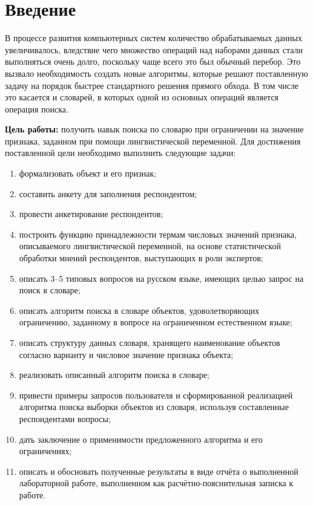 \chapter*{Введение}

В процессе развития компьютерных систем количество обрабатываемых данных увеличивалось, вледствие чего множество операций над наборами данных стали выполняться очень долго, поскольку чаще всего это был обычный перебор. 
Это вызвало необходимость создать новые алгоритмы, которые решают поставленную задачу на порядок быстрее стандартного решения прямого обхода. 
В том числе это касается и словарей, в которых одной из основных операций является операция поиска.


\textbf{Цель работы:} получить навык поиска по словарю при ограничении на значение признака, заданном при помощи лингвистической переменной.
Для достижения поставленной цели необходимо выполнить следующие задачи:
\begin{enumerate}[label=\arabic*)]
	\item формализовать объект и его признак;
	\item составить анкету для заполнения респондентом;
	\item провести анкетирование респондентов;
	\item построить функцию принадлежности термам числовых значений признака, описываемого лингвистической переменной, на основе статистической обработки мнений респондентов, выступающих в роли экспертов;
	\item описать 3--5 типовых вопросов на русском языке, имеющих целью запрос на поиск в словаре;
	\item описать алгоритм поиска в словаре объектов, удоволетворяющих ограничению, заданному в вопросе на ограниченном естественном языке;
	\item описать структуру данных словаря, хранящего наименование объектов согласно варианту и числовое значение признака объекта;
	\item реализовать описанный алгоритм поиска в словаре;
	\item привести примеры запросов пользователя и сформированной реализацией алгоритма поиска выборки объектов из словаря, используя составленные респондентами вопросы;
	\item дать заключение о применимости предложенного алгоритма и его ограничениях;
	\item описать и обосновать полученные результаты в виде отчёта о выполненной лабораторной работе, выполненном как расчётно-пояснительная записка к работе.
\end{enumerate}